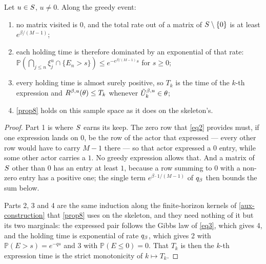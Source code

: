 \begin{lemma}
  \label{aux-holding-times}
  \leanok
  Let $u \in S$, $u \ne 0$.  Along the greedy event:
  \begin{enumerate}
    \item no matrix visited is $0$, and the total rate out of a matrix of
      $S \setminus \{0\}$ is at least $e^{\beta/(M-1)}$;
    \item each holding time is therefore dominated by an exponential of that
      rate: $\mathbb{P}(\bigcap_{j \le n} \xi_j^u \cap \{E_n > s\}) \le
      e^{-e^{\beta/(M-1)} s}$ for $s \ge 0$;
    \item every holding time is almost surely positive, so $T_k$ is the time of
      the $k$-th expression and $R^{\beta,u}(\theta) \le T_k$ whenever
      $\tilde{U}^{\beta,u}_k \in \theta$;
    \item \ref{prop8} holds on this sample space as it does on the skeleton's.
  \end{enumerate}
\end{lemma}
\begin{proof}
  \leanok
  Part 1 is where $S$ earns its keep.  The zero row that \eqref{eq2}
  provides must, if one expression lands on $0$, be the row of the actor that
  expressed --- every other row would have to carry $M-1$ there --- so that
  actor expressed a $0$ entry, while some other actor carries a $1$.  No greedy
  expression allows that.  And a matrix of $S$ other than $0$ has an entry
  at least $1$, because a row summing to $0$ with a non-zero entry has a
  positive one; the single term $e^{\beta \cdot 1/(M-1)}$ of $q_\beta$ then
  bounds the sum below.

  Parts 2, 3 and 4 are the same induction along the finite-horizon kernels of
  \ref{aux-construction} that \ref{prop8} uses on the skeleton, and they need
  nothing of it but its two marginals: the expressed pair follows the Gibbs law
  of \eqref{eq3}, which gives 4, and the holding time is exponential of rate
  $q_\beta$, which
  gives 2 with $\mathbb{P}(E > s) = e^{-q s}$ and 3 with
  $\mathbb{P}(E \le 0) = 0$.  That $T_k$ is then the $k$-th expression time is
  the strict monotonicity of $k \mapsto T_k$.
\end{proof}

